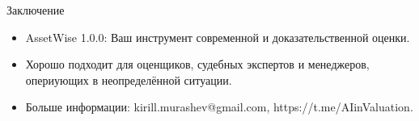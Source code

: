 \documentclass{beamer}
\begin{document}
\begin{frame}{Заключение}
	\begin{itemize}
		\item AssetWise 1.0.0: Ваш инструмент современной и доказательственной оценки.
		\item Хорошо подходит для оценщиков, судебных экспертов и менеджеров, опериующих в неопределённой ситуации.
		\item Больше информации: kirill.murashev@gmail.com, https://t.me/AIinValuation.
	\end{itemize}
\end{frame}
\end{document}
